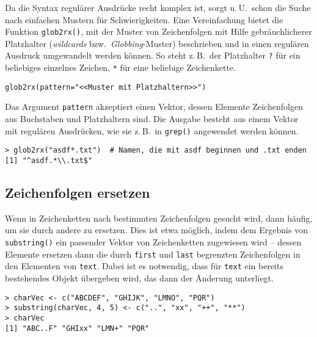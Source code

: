 Da die Syntax regulärer Ausdrücke recht komplex ist, sorgt u.\,U.\ schon die Suche nach einfachen Mustern für Schwierigkeiten. Eine Vereinfachung bietet die Funktion \lstinline!glob2rx()!, mit der Muster von Zeichenfolgen mit Hilfe gebräuchlicherer Platzhalter (\emph{wildcards} bzw.\ \emph{Globbing}-Muster) beschrieben und in einen regulären Ausdruck umgewandelt werden können. So steht z.\,B.\ der Platzhalter \lstinline!?! für ein beliebiges einzelnes Zeichen, \lstinline!*! für eine beliebige Zeichenkette.
\begin{lstlisting}
glob2rx(pattern="<<Muster mit Platzhaltern>>")
\end{lstlisting}

Das Argument \lstinline!pattern! akzeptiert einen Vektor, dessen Elemente Zeichenfolgen aus Buchstaben und Platzhaltern sind. Die Ausgabe besteht aus einem Vektor mit regulären Ausdrücken, wie sie z.\,B.\ in \lstinline!grep()! angewendet werden können.
\begin{lstlisting}
> glob2rx("asdf*.txt")  # Namen, die mit asdf beginnen und .txt enden
[1] "^asdf.*\\.txt$"
\end{lstlisting}

\subsection{Zeichenfolgen ersetzen}
\label{sec:strSub}

Wenn in Zeichenketten nach bestimmten Zeichenfolgen gesucht wird, dann häufig, um sie durch andere zu ersetzen. Dies ist etwa möglich, indem dem Ergebnis von \lstinline!substring()! ein passender Vektor von Zeichenketten zugewiesen wird -- dessen Elemente ersetzen dann die durch \lstinline!first! und \lstinline!last! begrenzten Zeichenfolgen in den Elementen von \lstinline!text!. Dabei ist es notwendig, dass für \lstinline!text! ein bereits bestehendes Objekt übergeben wird, das dann der Änderung unterliegt.
\begin{lstlisting}
> charVec <- c("ABCDEF", "GHIJK", "LMNO", "PQR")
> substring(charVec, 4, 5) <- c("..", "xx", "++", "**")
> charVec
[1] "ABC..F" "GHIxx" "LMN+" "PQR"
\end{lstlisting}

